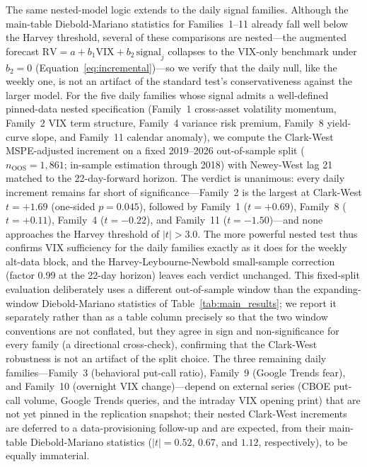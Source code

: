 \documentclass[12pt,a4paper]{article}
\begin{document}
The same nested-model logic extends to the daily signal families. Although the main-table Diebold-Mariano statistics for Families~1--11 already fall well below the Harvey threshold, several of these comparisons are nested---the augmented forecast $\text{RV} = a + b_1\text{VIX} + b_2\,\text{signal}_j$ collapses to the VIX-only benchmark under $b_2 = 0$ (Equation~\ref{eq:incremental})---so we verify that the daily null, like the weekly one, is not an artifact of the standard test's conservativeness against the larger model. For the five daily families whose signal admits a well-defined pinned-data nested specification (Family~1 cross-asset volatility momentum, Family~2 VIX term structure, Family~4 variance risk premium, Family~8 yield-curve slope, and Family~11 calendar anomaly), we compute the Clark-West MSPE-adjusted increment on a fixed 2019--2026 out-of-sample split ($n_{\text{OOS}} = 1{,}861$; in-sample estimation through 2018) with Newey-West lag 21 matched to the 22-day-forward horizon. The verdict is unanimous: every daily increment remains far short of significance---Family~2 is the largest at Clark-West $t = +1.69$ (one-sided $p = 0.045$), followed by Family~1 ($t = +0.69$), Family~8 ($t = +0.11$), Family~4 ($t = -0.22$), and Family~11 ($t = -1.50$)---and none approaches the Harvey threshold of $|t| > 3.0$. The more powerful nested test thus confirms VIX sufficiency for the daily families exactly as it does for the weekly alt-data block, and the Harvey-Leybourne-Newbold small-sample correction (factor 0.99 at the 22-day horizon) leaves each verdict unchanged. This fixed-split evaluation deliberately uses a different out-of-sample window than the expanding-window Diebold-Mariano statistics of Table~\ref{tab:main_results}; we report it separately rather than as a table column precisely so that the two window conventions are not conflated, but they agree in sign and non-significance for every family (a directional cross-check), confirming that the Clark-West robustness is not an artifact of the split choice. The three remaining daily families---Family~3 (behavioral put-call ratio), Family~9 (Google Trends fear), and Family~10 (overnight VIX change)---depend on external series (CBOE put-call volume, Google Trends queries, and the intraday VIX opening print) that are not yet pinned in the replication snapshot; their nested Clark-West increments are deferred to a data-provisioning follow-up and are expected, from their main-table Diebold-Mariano statistics ($|t| = 0.52$, $0.67$, and $1.12$, respectively), to be equally immaterial.
\end{document}
